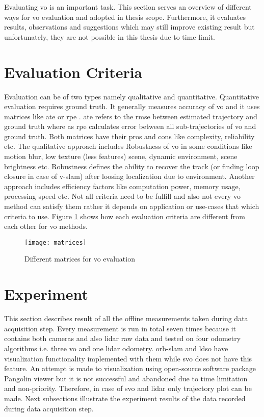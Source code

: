 Evaluating \acrshort{vo} is an important task. This section serves an overview of different ways for \acrshort{vo} evaluation and adopted in thesis scope. Furthermore, it evaluates results, observations and suggestions which may still improve existing result but unfortunately, they are not possible in this thesis due to time limit.
  
\section{Evaluation Criteria}
Evaluation can be of two types namely qualitative and quantitative. Quantitative evaluation requires ground truth. It generally measures accuracy of \acrshort{vo} and it uses matrices like \acrfull{ate} or \acrfull{rpe} \cite{7782863}. \acrshort{ate} refers to the \acrshort{rmse} between estimated trajectory and ground truth where as \acrshort{rpe} calculates error between all sub-trajectories of \acrshort{vo} and ground truth. Both matrices have their pros and cons like complexity, reliability etc. The qualitative approach includes Robustness of \acrshort{vo} in some conditions like motion blur, low texture (less features) scene, dynamic environment, scene brightness etc. Robustness defines the ability to recover the track (or finding loop closure in case of \acrshort{v-slam}) after loosing localization due to environment. Another approach includes efficiency factors like computation power, memory usage, processing speed etc. Not all criteria need to be fulfill and also not every \acrshort{vo} method can satisfy them rather it depends on application or use-cases that which criteria to use. Figure \ref{fig:matrices} shows how each evaluation criteria are different from each other for \acrshort{vo} methods.     
\begin{figure}[H]
	\centering
	\texttt{[image: matrices]}
	\caption{Different matrices for \acrshort{vo} evaluation \cite{lecture}}
	\label{fig:matrices}
\end{figure}

\section{Experiment}
This section describes result of all the offline measurements taken during data acquisition step. Every measurement is run in total seven times because it contains both cameras and also \acrshort{lidar} raw data and tested on four odometry algorithms i.e. three \acrshort{vo} and one \acrshort{lidar} odometry. \acrshort{orb}-\acrshort{slam} and \acrshort{ldso} have visualization functionality implemented with them while \acrshort{svo} does not have this feature. An attempt is made to visualization using open-source software package Pangolin viewer but it is not successful and abandoned due to time limitation and non-priority. Therefore, in case of \acrshort{svo} and \acrshort{lidar} only trajectory plot can be made. Next subsections illustrate the experiment results of the data recorded during data acquisition step.

